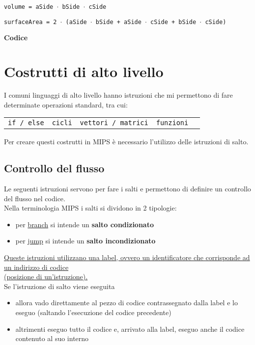 \documentclass[../main.tex]{subfiles}
\begin{document}
\texttt{volume = aSide $\cdot$ bSide $\cdot$ cSide}

\texttt{surfaceArea = 2 $\cdot$ (aSide $\cdot$ bSide + aSide $\cdot$ cSide + bSide $\cdot$ cSide)}

\vspace*{2mm}

\noindent
\textbf{Codice} \\


\newpage

\chapter{Costrutti di alto livello}
I comuni linguaggi di alto livello hanno istruzioni che mi permettono
di fare determinate operazioni standard, tra cui:
\vspace*{-2mm}
\begin{table}[h!]
    \centering

    \setlength{\tabcolsep}{18pt}
    \begin{tabular}{ c c c c c }
        \texttt{if / else} & \texttt{cicli} & \texttt{vettori / matrici} & \texttt{funzioni} \\
    \end{tabular}
\end{table}
\vspace*{-2mm}

\noindent
Per creare questi costrutti in MIPS è necessario l'utilizzo
delle istruzioni di salto.

\section{Controllo del flusso}
Le seguenti istruzioni servono per fare i salti e permettono
di definire un controllo del flusso nel codice. \\
Nella terminologia MIPS i salti si dividono in 2 tipologie:
\begin{itemize}
    \item per \underline{branch} si intende un \textbf{salto condizionato}
    \item per \underline{jump} si intende un \textbf{salto incondizionato}
\end{itemize}

\vspace{2mm}

\noindent
\underline{Queste istruzioni utilizzano una label, ovvero un identificatore
che corrisponde ad un indirizzo di codice} \\
\underline{(posizione di un'istruzione).}
\\[2mm]
Se l'istruzione di salto viene eseguita
\begin{itemize}
    \item allora vado direttamente al pezzo di codice contrassegnato
    dalla label e lo eseguo (saltando l'esecuzione del codice precedente)
    \item altrimenti eseguo tutto il codice e, arrivato alla label,
    eseguo anche il codice contenuto al suo interno
\end{itemize}
\end{document}
